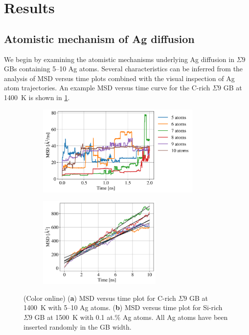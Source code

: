 \documentclass[%
preprint,
amsmath,amssymb,
aps,
]{revtex4-2}
\newcommand{\?}{\stackrel{?}{=}}
\begin{document}

\section{Results}

\subsection{Atomistic mechanism of Ag diffusion}

We begin by examining the atomistic mechanisms underlying Ag diffusion in $\Sigma 9$ GBs containing 5--10 Ag atoms. Several characteristics can be inferred from the analysis of MSD versus time plots combined with the visual inspection of Ag atom trajectories. An example MSD versus time curve for the C-rich $\Sigma 9$ GB at 1400~K is shown in \cref{Fig:InitialConfig}. 


\begin{figure}[h!]
\centering
\begin{subfigure}[b]{0.50\textwidth}
  \centering
  \includegraphics[height=4.5cm]{MSD_vs_time_Sigma_9_C-rich_1400.png}
  \caption{}
  \label{Fig:InitialConfig}
\end{subfigure}
\hspace{1em}
\begin{subfigure}[b]{0.45\textwidth}
  \centering
  \includegraphics[height=4.5cm]{MSD_vs_time_Sigma_9_Si-rich_1500.png}
  \caption{}
  \label{Fig:0.1Ag}
\end{subfigure}
\caption{(Color online) (\textbf{a}) MSD versus time plot for C-rich $\Sigma 9$ GB at 1400~K with 5--10 Ag atoms. (\textbf{b}) MSD versus time plot for Si-rich $\Sigma 9$ GB at 1500~K with 0.1 at.\% Ag atoms. All Ag atoms have been inserted randomly in the GB width.}
\end{figure}
\end{document}
